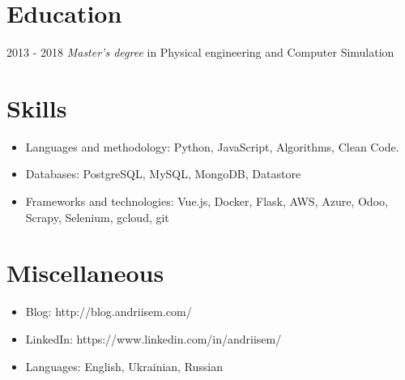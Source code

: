 \documentclass{resume}
\begin{document}
\section{Education}
 {2013 - 2018}
\textit{Master's degree} in Physical engineering and Computer Simulation



\section{Skills}
\begin{itemize}[parsep=0.5ex]
    \item Languages and methodology: Python, JavaScript, Algorithms, Clean Code.
    \item Databases: PostgreSQL, MySQL, MongoDB, Datastore
    \item Frameworks and technologies: Vue.js, Docker, Flask, AWS, Azure, Odoo, Scrapy, Selenium, gcloud, git
\end{itemize}

\section{Miscellaneous}
\begin{itemize}[parsep=0.5ex]
  \item Blog: http://blog.andriisem.com/
  \item LinkedIn: https://www.linkedin.com/in/andriisem/
  \item Languages: English, Ukrainian, Russian
\end{itemize}
\end{document}
